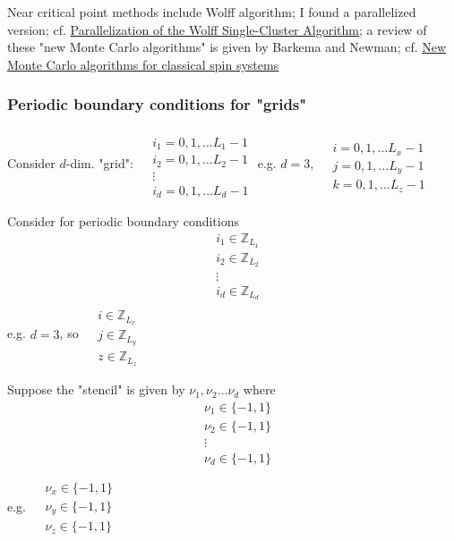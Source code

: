 \documentclass[10pt]{amsart}
\begin{document}
\begin{multicols*}{2}
Near critical point methods include Wolff algorithm; I found a parallelized version; cf. \href{https://pdfs.semanticscholar.org/985f/282b432feb4e05f5f3156076f65b43a8d28e.pdf}{Parallelization of the Wolff Single-Cluster Algorithm}; a review of these "new Monte Carlo algorithms" is given by Barkema and Newman; cf. \href{https://arxiv.org/abs/cond-mat/9703179}{New Monte Carlo algorithms for classical spin systems}  

\subsubsection{Periodic boundary conditions for "grids"}

Consider $d$-dim. "grid":  $\begin{aligned} & \quad \\ 
	& i_1  = 0 ,1,\dots L_1 -1 \\
	& i_2 = 0,1,\dots L_2 - 1 \\ 
	& \vdots \\
	& i_d = 0,1,\dots L_d-1 \end{aligned}$ e.g. $d=3$, $\begin{aligned} & \quad \\ 
& i = 0 , 1,\dots L_x - 1 \\ 
 & j = 0,1, \dots L_y - 1 \\ 
 & k = 0,1,\dots L_z - 1 \end{aligned}$  
 
 Consider for periodic boundary conditions 
 \[
 \begin{aligned}
	& i_1 \in \mathbb{Z}_{L_1} \\ 
	& i_2 \in \mathbb{Z}_{L_2} \\ 
	& \vdots \\ 
	& i_d \in \mathbb{Z}_{L_d} 
 \end{aligned}
 \]
 e.g. $d=3$, so $\begin{aligned} & \quad \\ 
 	& i \in \mathbb{Z}_{L_x} \\ 
 	& j \in \mathbb{Z}_{L_y} \\
 	& z \in \mathbb{Z}_{L_z} \end{aligned}$  
 	
 	Suppose the "stencil" is given by $\nu_1, \nu_2 \dots \nu_d$ where 
 	\[
 	\begin{aligned}
 	& \nu_1 \in \lbrace -1, 1 \rbrace \\ 
 	& \nu_2 \in \lbrace -1, 1 \rbrace \\ 
 	& \vdots \\ 
 	& \nu_d \in \lbrace -1, 1 \rbrace \\ 
 	\end{aligned} 	
 	\]
 e.g. $  	\begin{aligned} & \qquad \\ 
 & \nu_x \in \lbrace -1, 1 \rbrace \\ 
 & \nu_y \in \lbrace -1, 1 \rbrace \\ 
 & \nu_z \in \lbrace -1, 1 \rbrace \\ 
 \end{aligned} 	
 $ 




\end{multicols*}
\end{document}
